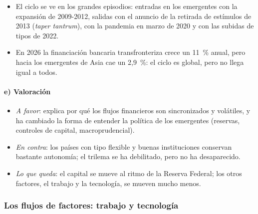 \documentclass[11pt]{article}
\begin{document}
\begin{itemize}
\item El ciclo se ve en los grandes episodios: entradas en los emergentes con la expansión de 2009-2012, salidas con el anuncio de la retirada de estímulos de 2013 (\emph{taper tantrum}), con la pandemia en marzo de 2020 y con las subidas de tipos de 2022\nocite{MirandaAgrippinoRey2020}.
\item En 2026 la financiación bancaria transfronteriza crece un 11~\% anual, pero hacia los emergentes de Asia cae un 2,9~\%: el ciclo es global, pero no llega igual a todos\nocite{BPI2026Comentario}.
\end{itemize}

\paragraph{e) Valoración}

\begin{itemize}
\item \emph{A favor}: explica por qué los flujos financieros son sincronizados y volátiles, y ha cambiado la forma de entender la política de los emergentes (reservas, controles de capital, macroprudencial).
\item \emph{En contra}: los países con tipo flexible y buenas instituciones conservan bastante autonomía; el trilema se ha debilitado, pero no ha desaparecido\nocite{ObstfeldOstryQureshi2019}.
\item \emph{Lo que queda}: el capital se mueve al ritmo de la Reserva Federal; los otros factores, el trabajo y la tecnología, se mueven mucho menos.
\end{itemize}

\subsubsection{Los flujos de factores: trabajo y tecnología}\label{sec:factores}
\end{document}
